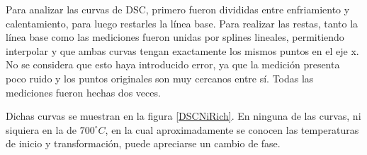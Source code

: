 \documentclass[12pt]{article}
\theoremstyle{definition}
\theoremstyle{remark}
\begin{document}
{Para analizar las curvas de DSC, primero fueron divididas entre enfriamiento y calentamiento, para luego restarles la línea base. Para realizar las restas, tanto la línea base como las mediciones fueron unidas por splines lineales, permitiendo interpolar y que ambas curvas tengan exactamente los mismos puntos en el eje x. No se considera que esto haya introducido error, ya que la medición presenta poco ruido y los puntos originales son muy cercanos entre sí. Todas las mediciones fueron hechas dos veces.

Dichas curvas se muestran en la figura \ref{DSCNiRich}. En ninguna de las curvas, ni siquiera en la de $700 ^\circ C$, en la cual aproximadamente se conocen las temperaturas de inicio y transformación, puede apreciarse un cambio de fase.

\begin{figure}[H]
\noindent{}\\
\noindent\makebox[\linewidth][c]{
}
\end{figure}}
\end{document}
